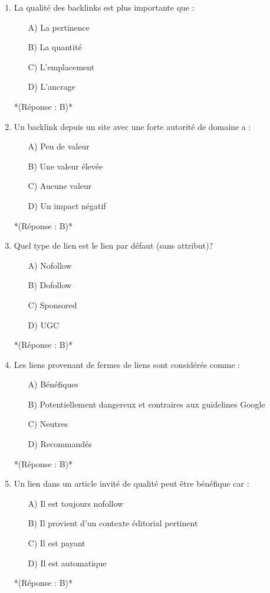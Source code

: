 \documentclass[12pt,a4paper,twoside]{report}
\begin{document}
\begin{enumerate}
\item La qualité des backlinks est plus importante que :
\begin{itemize}
\item[A)] La pertinence
\item[B)] La quantité
\item[C)] L'emplacement
\item[D)] L'ancrage
\end{itemize}
*(Réponse : B)*

\item Un backlink depuis un site avec une forte autorité de domaine a :
\begin{itemize}
\item[A)] Peu de valeur
\item[B)] Une valeur élevée
\item[C)] Aucune valeur
\item[D)] Un impact négatif
\end{itemize}
*(Réponse : B)*

\item Quel type de lien est le lien par défaut (sans attribut)?
\begin{itemize}
\item[A)] Nofollow
\item[B)] Dofollow
\item[C)] Sponsored
\item[D)] UGC
\end{itemize}
*(Réponse : B)*

\item Les liens provenant de fermes de liens sont considérés comme :
\begin{itemize}
\item[A)] Bénéfiques
\item[B)] Potentiellement dangereux et contraires aux guidelines Google
\item[C)] Neutres
\item[D)] Recommandés
\end{itemize}
*(Réponse : B)*

\item Un lien dans un article invité de qualité peut être bénéfique car :
\begin{itemize}
\item[A)] Il est toujours nofollow
\item[B)] Il provient d'un contexte éditorial pertinent
\item[C)] Il est payant
\item[D)] Il est automatique
\end{itemize}
*(Réponse : B)*


\end{enumerate}
\end{document}
